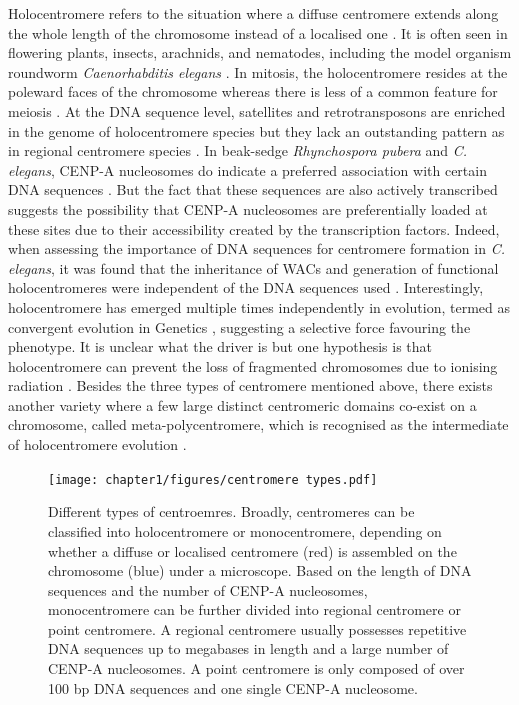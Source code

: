 Holocentromere refers to the situation where a diffuse centromere extends along the whole length of the chromosome instead of a localised one \citep{Guerra2010NeocentricsRules}. It is often seen in flowering plants, insects, arachnids, and nematodes, including the model organism roundworm \textit{Caenorhabditis elegans} \citep{Wong2020LessonsChromosomes}. In mitosis, the holocentromere resides at the poleward faces of the chromosome whereas there is less of a common feature for meiosis \citep{Maddox2004HoloerElegans, Buchwitz1999AElegans, Marques2016HolocentromereHolocentromeres}. At the DNA sequence level, satellites and retrotransposons are enriched in the genome of holocentromere species but they lack an outstanding pattern as in regional centromere species \citep{Kang2016DifferentialElimination, Heckmann2013TheOrganization, Marques2016RestructuringPubera}. In beak-sedge \textit{Rhynchospora pubera} and \textit{C. elegans}, CENP-A nucleosomes do indicate a preferred association with certain DNA sequences \citep{Marques2016HolocentromereHolocentromeres, Gassmann2012AnElegans, Steiner2014HolocentromeresHotspots}. But the fact that these sequences are also actively transcribed suggests the possibility that CENP-A nucleosomes are preferentially loaded at these sites due to their accessibility created by the transcription factors. Indeed, when assessing the importance of DNA sequences for centromere formation in \textit{C. elegans}, it was found that the inheritance of WACs and generation of functional holocentromeres were independent of the DNA sequences used \citep{Stinchcomb1985ExtrachromosomalElegans, Yuen2011RapidEmbryos}. Interestingly, holocentromere has emerged multiple times independently in evolution, termed as convergent evolution in Genetics \citep{Guerra2019MonocentricFamily, Drinnenberg2014RecurrentInsects, Melters2012HolocentricAnalysis}, suggesting a selective force favouring the phenotype. It is unclear what the driver is but one hypothesis is that holocentromere can prevent the loss of fragmented chromosomes due to ionising radiation \citep{Zedek2018HolocentricLand}. Besides the three types of centromere mentioned above, there exists another variety where a few large distinct centromeric domains co-exist on a chromosome, called meta-polycentromere, which is recognised as the intermediate of holocentromere evolution \citep{Neumann2012StretchingDomains}. 

\begin{figure}[htbp]
  \centering
  \texttt{[image: chapter1/figures/centromere types.pdf]}
  \caption[Different types of centroemres]{Different types of centroemres. Broadly, centromeres can be classified into holocentromere or monocentromere, depending on whether a diffuse or localised centromere (red) is assembled on the chromosome (blue) under a microscope. Based on the length of DNA sequences and the number of CENP-A nucleosomes, monocentromere can be further divided into regional centromere or point centromere. A regional centromere usually possesses repetitive DNA sequences up to megabases in length and a large number of CENP-A nucleosomes. A point centromere is only composed of over 100 bp DNA sequences and one single CENP-A nucleosome. }
  \label{fig:cenTypes}
\end{figure}

